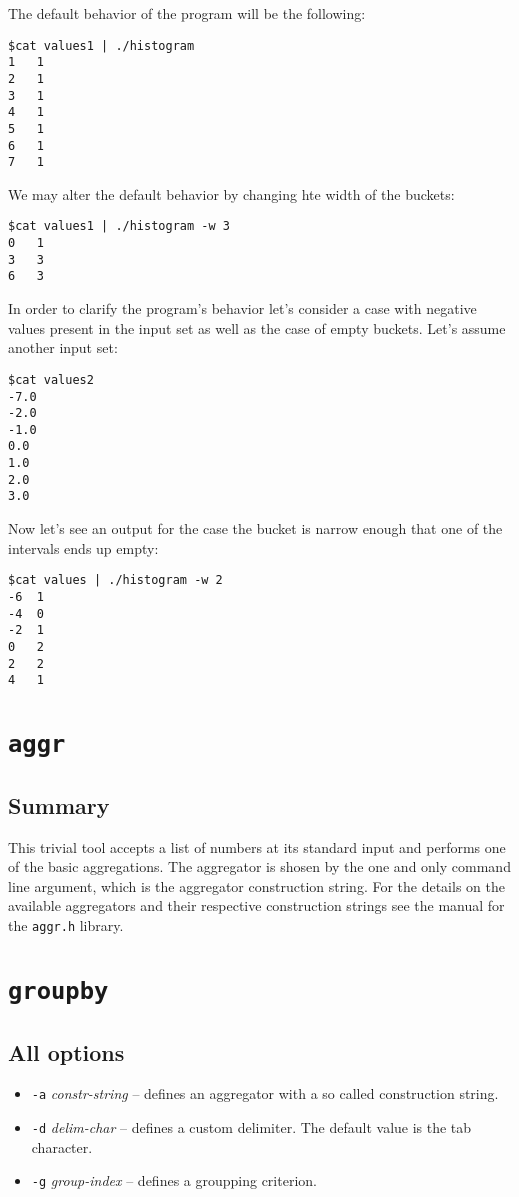 \documentclass{report}
\begin{document}
The default behavior of the program will be the following:
\begin{verbatim}
$cat values1 | ./histogram
1	1
2	1
3	1
4	1
5	1
6	1
7	1
\end{verbatim}

We may alter the default behavior by changing hte width of the buckets:
\begin{verbatim}
$cat values1 | ./histogram -w 3
0	1
3	3
6	3
\end{verbatim}

In order to clarify the program's behavior let's consider a case with negative values
present in the input set as well as the case of empty buckets. Let's assume another
input set:
\begin{verbatim}
$cat values2
-7.0
-2.0
-1.0
0.0
1.0
2.0
3.0
\end{verbatim}

Now let's see an output for the case the bucket is narrow enough that one of the
intervals ends up empty:
\begin{verbatim}
$cat values | ./histogram -w 2
-6	1
-4	0
-2	1
0	2
2	2
4	1
\end{verbatim}

\section{\texttt{aggr}}

\subsection{Summary}
This trivial tool accepts a list of numbers at its standard input and performs 
one of the basic aggregations. The aggregator is shosen by the one and only
command line argument, which is the aggregator construction string. For the
details on the available aggregators and their respective construction strings
see the manual for the \texttt{aggr.h} library.

\section{\texttt{groupby}}

\subsection{All options}
\begin{itemize}
	\item \texttt{-a} \textit{constr-string} -- defines an aggregator with a
		so called construction string.
	\item \texttt{-d} \textit{delim-char} -- defines a custom delimiter.
		The default value is the tab character.
	\item \texttt{-g} \textit{group-index} -- defines a groupping criterion.
\end{itemize}
\end{document}
